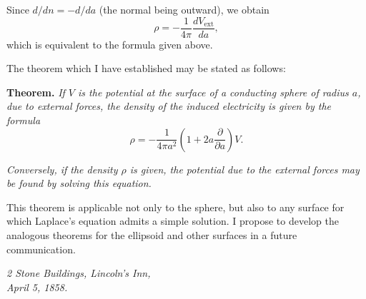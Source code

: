 \documentclass[11pt,a4paper]{article}
\begin{document}
Since $d/dn = -d/da$ (the normal being outward), we obtain
\[
\rho = -\frac{1}{4\pi} \frac{dV_{\text{ext}}}{da},
\]
which is equivalent to the formula given above.

\setcounter{page}{100}

The theorem which I have established may be stated as follows:

\medskip
\noindent\textbf{Theorem.} \textit{If $V$ is the potential at the surface of a conducting sphere of radius $a$, due to external forces, the density of the induced electricity is given by the formula}
\[
\rho = -\frac{1}{4\pi a^2} \left(1 + 2a\frac{\partial}{\partial a}\right) V.
\]

\textit{Conversely, if the density $\rho$ is given, the potential due to the external forces may be found by solving this equation.}

\medskip
This theorem is applicable not only to the sphere, but also to any surface for which Laplace's equation admits a simple solution. I propose to develop the analogous theorems for the ellipsoid and other surfaces in a future communication.

\medskip
\noindent\textit{2 Stone Buildings, Lincoln's Inn,\\April 5, 1858.}
\end{document}
